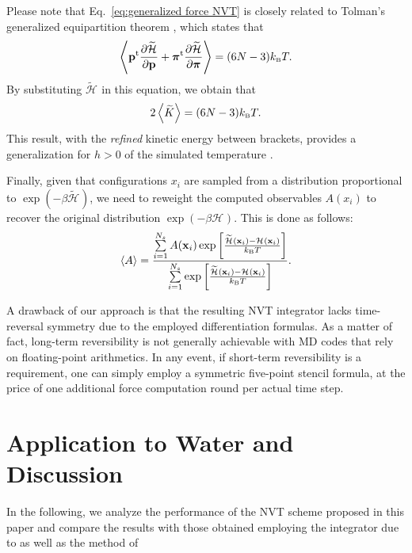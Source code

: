 \documentclass[
journal=jctcce,
layout=twocolumn
]{achemso}
\newcommand{\vt}[1]{\boldsymbol{\mathbf{#1}}}   %
\newcommand{\tr}[1]{#1^\text{t}}                %
\newcommand{\diff}[2]{\frac{\partial #1}{\partial #2}} %
\newcommand{\Ham}[1]{{\mathcal H}_\text{#1}}    %
\newcommand{\modified}[1]{\widetilde{#1}}
\begin{document}
Please note that Eq.~\ref{eq:generalized force NVT} is closely related to Tolman's generalized equipartition theorem \cite{Uline_2008}, which states that
\begin{equation*}
\left\langle \tr{\vt p} \diff{\modified{\Ham{}}}{\vt p} + \tr{\vt \pi} \diff{\modified{\Ham{}}}{\vt \pi} \right\rangle = (6N - 3) k_\text{\tiny B} T.
\end{equation*}
By substituting $\modified{\Ham{}}$ in this equation, we obtain that
\begin{equation}
2\left\langle \modified{K} \right\rangle = (6N - 3) k_\text{\tiny B} T.
\end{equation}
This result, with the \textit{refined} kinetic energy between brackets, provides a generalization for $h > 0$ of the simulated temperature \cite{Eastwood_2010}.

Finally, given that configurations $x_i$ are sampled from a distribution proportional to $\exp(-\beta \modified{\Ham{}})$, we need to reweight the computed observables $A(x_i)$ to recover the original distribution $\exp (-\beta \Ham{})$.
This is done as follows:
\begin{equation}
\label{eq:reweighting}
\langle A \rangle = \frac{\sum\limits_{i=1}^{N_s} A(\vt x_i) \exp \left[{\frac{\modified{\Ham{}}(\vt x_i) - {\Ham{}}(\vt x_i)}{k_\text{\tiny B} T}}\right]}{\sum\limits_{i=1}^{N_s} \exp \left[{\frac{\modified{\Ham{}}(\vt x_i) - {\Ham{}}(\vt x_i)}{k_\text{\tiny B} T}}\right] }.
\end{equation}

A drawback of our approach is that the resulting NVT integrator lacks time-reversal symmetry due to the employed differentiation formulas.
As a matter of fact, long-term reversibility is not generally achievable with MD codes that rely on floating-point arithmetics.
In any event, if short-term reversibility is a requirement, one can simply employ a symmetric five-point stencil formula, at the price of one additional force computation round per actual time step.

\section{Application to Water and Discussion}
\label{sec:numerical_results}

In the following, we analyze the performance of the NVT scheme proposed in  this paper and compare the results with those obtained employing the integrator due to \citeauthor{Martyna_1996} \cite{Martyna_1996} as well as the method of \citeauthor{Kamberaj_2005} \cite{Kamberaj_2005}
\end{document}
